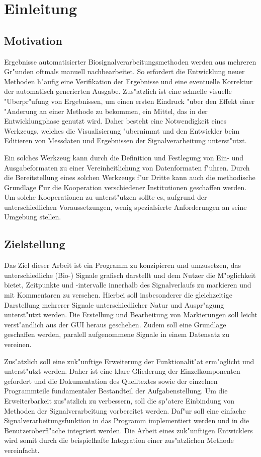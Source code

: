 \chapter{Einleitung}

\section{Motivation}

Ergebnisse automatisierter Biosignalverarbeitungsmethoden werden aus mehreren Gr"unden oftmals manuell nachbearbeitet.
So erfordert die Entwicklung neuer Methoden h"aufig eine Verifikation der Ergebnisse und eine eventuelle Korrektur der automatisch generierten Ausgabe.
Zus"atzlich ist eine schnelle visuelle "Uberpr"ufung von Ergebnissen, um einen ersten Eindruck "uber den Effekt einer "Anderung an einer Methode zu bekommen, ein Mittel, das in der Entwicklungphase genutzt wird.
Daher besteht eine Notwendigkeit eines Werkzeugs, welches die Visualisierung "ubernimmt und den Entwickler beim Editieren von Messdaten und Ergebnissen der Signalverarbeitung unterst"utzt.

Ein solches Werkzeug kann durch die Definition und Festlegung von Ein- und Ausgabeformaten zu einer Vereinheitlichung von Datenformaten f"uhren.
Durch die Bereitstellung eines solchen Werkzeugs f"ur Dritte kann auch die methodische Grundlage f"ur die Kooperation verschiedener Institutionen geschaffen werden.
Um solche Kooperationen zu unterst"utzen sollte es, aufgrund der unterschiedlichen Voraussetzungen, wenig spezialsierte Anforderungen an seine Umgebung stellen.

\section{Zielstellung}

Das Ziel dieser Arbeit ist ein Programm zu konzipieren und umzusetzen, das unterschiedliche (Bio-) Signale grafisch darstellt und dem Nutzer die M"oglichkeit bietet, Zeitpunkte und -intervalle innerhalb des Signalverlaufs zu markieren und mit Kommentaren zu versehen.
Hierbei soll insbesonderer die gleichzeitige Darstellung mehrerer Signale unterschiedlicher Natur und Auspr"agung unterst"utzt werden.
Die Erstellung und Bearbeitung von Markierungen soll leicht verst"andlich aus der \ac{GUI} heraus geschehen.
Zudem soll eine Grundlage geschaffen werden, paralell aufgenommene Signale in einem Datensatz zu vereinen.

Zus"atzlich soll eine zuk"unftige Erweiterung der Funktionalit"at erm"oglicht und unterst"utzt werden.
Daher ist eine klare Gliederung der Einzelkomponenten gefordert und die Dokumentation des Quelltextes sowie der einzelnen Programmteile fundamentaler Bestandteil der Aufgabenstellung.
Um die Erweiterbarkeit zus"atzlich zu verbessern, soll die sp"atere Einbindung von Methoden der Signalverarbeitung vorbereitet werden.
Daf"ur soll eine einfache Signalverarbeitungsfunktion in das Programm implementiert werden und in die Benutzeroberfl"ache integriert werden.
Die Arbeit eines zuk"unftigen Entwicklers wird somit durch die beispielhafte Integration einer zus"atzlichen Methode vereinfacht.

